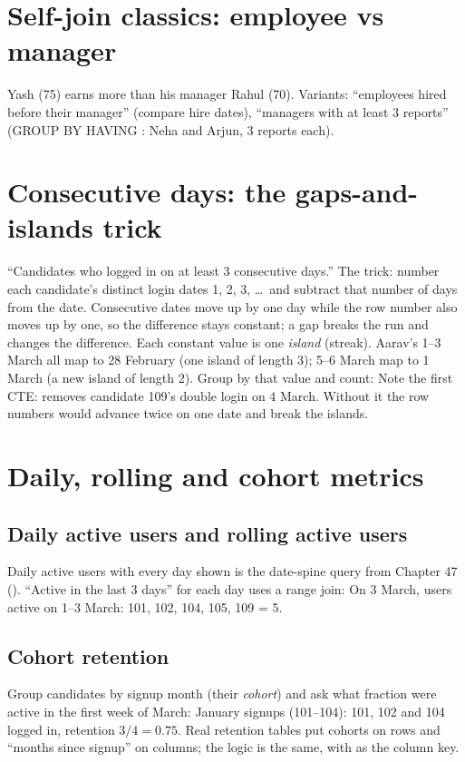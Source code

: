 \section{Self-join classics: employee vs manager}
Yash (75) earns more than his manager Rahul (70). Variants: ``employees hired before their manager'' (compare hire dates), ``managers with at least 3
reports'' (GROUP BY  HAVING : Neha and Arjun, 3 reports each).

\section{Consecutive days: the gaps-and-islands trick}
``Candidates who logged in on at least 3 consecutive days.'' The trick: number each candidate's distinct login dates 1, 2, 3, \dots\ and subtract that
number of days from the date. Consecutive dates move up by one day while the row number also moves up by one, so the difference stays constant; a gap
breaks the run and changes the difference. Each constant value is one \emph{island} (streak).
Aarav's 1--3 March all map to 28 February (one island of length 3); 5--6 March map to 1 March (a new island of length 2). Group by that value and count:
Note the first CTE:  removes candidate 109's double login on 4 March. Without it the row numbers would advance twice on one date
and break the islands.

\section{Daily, rolling and cohort metrics}
\subsection{Daily active users and rolling active users}
Daily active users with every day shown is the date-spine query from Chapter 47 (). ``Active in the last 3 days'' for each
day uses a range join:
On 3 March, users active on 1--3 March: 101, 102, 104, 105, 109 = 5.

\subsection{Cohort retention}
Group candidates by signup month (their \emph{cohort}) and ask what fraction were active in the first week of March:
January signups (101--104): 101, 102 and 104 logged in, retention $3/4 = 0.75$. Real retention tables put cohorts on rows and ``months since signup'' on
columns; the logic is the same, with  as the column key.

